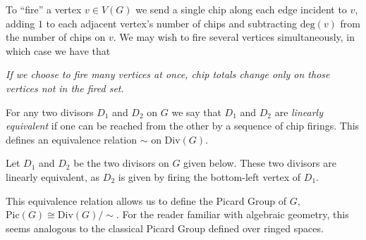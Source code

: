 \documentclass[10pt]{article}
\begin{document}
To ``fire'' a vertex $v\in V(G)$ we send a single chip along each edge incident to $v$, adding $1$ to each adjacent vertex's number of chips and subtracting $\text{deg}(v)$ from the number of chips on $v$. We may wish to fire several vertices simultaneously, in which case we have that

\begin{center}
  \emph{If we choose to fire many vertices at once, chip totals change only on those vertices not in the fired set.}
\end{center}

For any two divisors $D_1$ and $D_2$ on $G$ we say that $D_1$ and $D_2$ are \emph{linearly equivalent} if one can be reached from the other by a sequence of chip firings. This defines an equivalence relation $\sim$ on $\text{Div}(G)$.

\clearpage

\begin{boxEx}{}
  Let $D_1$ and $D_2$ be the two divisors on $G$ given below. These two divisors are linearly equivalent, as $D_2$ is given by firing the bottom-left vertex of  $D_1$.

  \begin{center}
  \end{center}
\end{boxEx}

This equivalence relation allows us to define the Picard Group of $G$, $\text{Pic}(G)\cong\text{Div}(G)/\sim$. For the reader familiar with algebraic geometry, this seems analogous to the classical Picard Group defined over ringed spaces.\\
\end{document}
